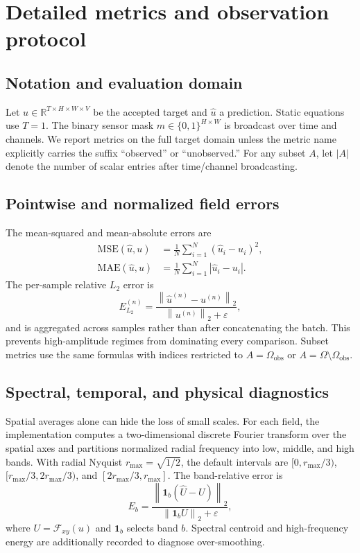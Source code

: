 \documentclass[10pt]{article}
\newcommand{\R}{\mathbb{R}}
\newcommand{\norm}[1]{\left\lVert #1 \right\rVert}
\newcommand{\obs}{\Omega_{\mathrm{obs}}}
\begin{document}
\section{Detailed metrics and observation protocol}
\label{sec:metrics}

\subsection{Notation and evaluation domain}

Let $u\in\R^{T\times H\times W\times V}$ be the accepted target and
$\widehat{u}$ a prediction.  Static equations use $T=1$.  The binary sensor
mask $m\in\{0,1\}^{H\times W}$ is broadcast over time and channels.  We report
metrics on the full target domain unless the metric name explicitly carries
the suffix ``observed'' or ``unobserved.''  For any subset $A$, let
$|A|$ denote the number of scalar entries after time/channel broadcasting.

\subsection{Pointwise and normalized field errors}

The mean-squared and mean-absolute errors are
\begin{align}
  \mathrm{MSE}(\widehat{u},u)
    &= \frac{1}{N}\sum_{i=1}^{N}(\widehat{u}_i-u_i)^2,\\
  \mathrm{MAE}(\widehat{u},u)
    &= \frac{1}{N}\sum_{i=1}^{N}|\widehat{u}_i-u_i|.
\end{align}
The per-sample relative $L_2$ error is
\begin{equation}
  E_{L_2}^{(n)} =
  \frac{\norm{\widehat{u}^{(n)}-u^{(n)}}_2}
       {\norm{u^{(n)}}_2+\varepsilon},
  \label{eq:rel-l2}
\end{equation}
and is aggregated across samples rather than after concatenating the batch.
This prevents high-amplitude regimes from dominating every comparison.
Subset metrics use the same formulas with indices restricted to
$A=\obs$ or $A=\Omega\setminus\obs$.

\subsection{Spectral, temporal, and physical diagnostics}

Spatial averages alone can hide the loss of small scales.  For each field, the
implementation computes a two-dimensional discrete Fourier transform over the
spatial axes and partitions normalized radial frequency into low, middle, and
high bands.  With radial Nyquist $r_{\max}=\sqrt{1/2}$, the default intervals
are $[0,r_{\max}/3)$, $[r_{\max}/3,2r_{\max}/3)$, and
$[2r_{\max}/3,r_{\max}]$.  The band-relative error is
\begin{equation}
  E_b = \frac{\norm{\mathbf{1}_b(\widehat{U}-U)}_2}
  {\norm{\mathbf{1}_b U}_2+\varepsilon},
  \label{eq:spectral-band}
\end{equation}
where $U=\mathcal{F}_{xy}(u)$ and $\mathbf{1}_b$ selects band $b$.  Spectral
centroid and high-frequency energy are additionally recorded to diagnose
over-smoothing.
\end{document}
